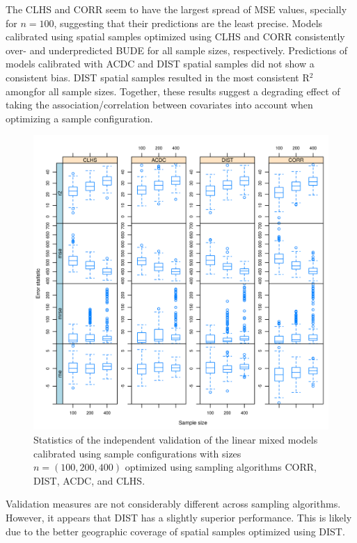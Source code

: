 The CLHS and CORR seem to have the largest spread of MSE values, specially for $n = 100$, suggesting that their
predictions are the least precise. Models calibrated using spatial samples optimized using CLHS and CORR 
consistently over- and underpredicted BUDE for all sample sizes, respectively. Predictions of models 
calibrated 
with ACDC and DIST spatial samples did not show a consistent bias. DIST spatial samples resulted in the most 
consistent R$^2$ amongfor all sample sizes. Together, these results suggest a degrading effect of taking the 
association/correlation between covariates into account when optimizing a sample configuration.

\begin{figure}[!ht]
 \centering
 \includegraphics[width=\textwidth]{fig/chap08-error-stats}

 \caption[Validation of linear mixed models calibrated using sample configurations optimized using four 
sampling
 algorithms.]{Statistics of the independent validation of the linear mixed models calibrated using sample 
configurations with 
 sizes $n = (100, 200, 400)$ optimized using sampling algorithms CORR, DIST,  ACDC, and CLHS.}
 \label{fig:chap08-validation}
\end{figure}

Validation measures are not considerably different across sampling algorithms. However, it appears that 
DIST has a slightly superior performance. This is likely due to the better geographic coverage of spatial 
samples optimized using DIST.

